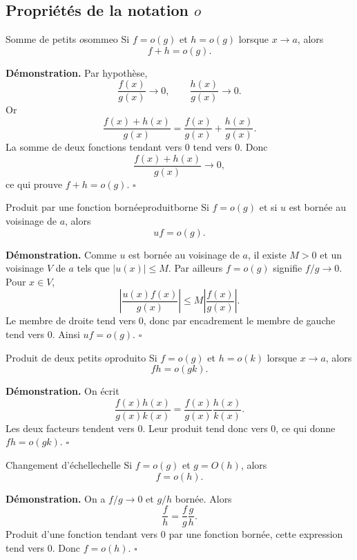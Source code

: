 \documentclass[11pt,a4paper]{article}
\begin{document}
\subsection{Propriétés de la notation $o$}

\begin{propositionbox}{Somme de petits $o$}{sommeo}
Si $f=o(g)$ et $h=o(g)$ lorsque $x\to a$, alors
\[
  f+h=o(g).
\]
\end{propositionbox}

\textbf{Démonstration.} Par hypothèse,
\[
  \frac{f(x)}{g(x)}\to0,\qquad \frac{h(x)}{g(x)}\to0.
\]
Or
\[
  \frac{f(x)+h(x)}{g(x)}=\frac{f(x)}{g(x)}+\frac{h(x)}{g(x)}.
\]
La somme de deux fonctions tendant vers $0$ tend vers $0$. Donc
\[
  \frac{f(x)+h(x)}{g(x)}\to0,
\]
ce qui prouve $f+h=o(g)$.
\hfill $\square$

\begin{propositionbox}{Produit par une fonction bornée}{produitborne}
Si $f=o(g)$ et si $u$ est bornée au voisinage de $a$, alors
\[
  uf=o(g).
\]
\end{propositionbox}

\textbf{Démonstration.} Comme $u$ est bornée au voisinage de $a$, il existe $M>0$ et un voisinage $V$ de $a$ tels que $|u(x)|\le M$. Par ailleurs $f=o(g)$ signifie $f/g\to0$. Pour $x\in V$,
\[
  \left|\frac{u(x)f(x)}{g(x)}\right|\le M\left|\frac{f(x)}{g(x)}\right|.
\]
Le membre de droite tend vers $0$, donc par encadrement le membre de gauche tend vers $0$. Ainsi $uf=o(g)$.
\hfill $\square$

\begin{propositionbox}{Produit de deux petits $o$}{produito}
Si $f=o(g)$ et $h=o(k)$ lorsque $x\to a$, alors
\[
  fh=o(gk).
\]
\end{propositionbox}

\textbf{Démonstration.} On écrit
\[
  \frac{f(x)h(x)}{g(x)k(x)}=\frac{f(x)}{g(x)}\frac{h(x)}{k(x)}.
\]
Les deux facteurs tendent vers $0$. Leur produit tend donc vers $0$, ce qui donne $fh=o(gk)$.
\hfill $\square$

\begin{propositionbox}{Changement d'échelle}{chelle}
Si $f=o(g)$ et $g=O(h)$, alors
\[
  f=o(h).
\]
\end{propositionbox}

\textbf{Démonstration.} On a $f/g\to0$ et $g/h$ bornée. Alors
\[
  \frac{f}{h}=\frac{f}{g}\frac{g}{h}.
\]
Produit d'une fonction tendant vers $0$ par une fonction bornée, cette expression tend vers $0$. Donc $f=o(h)$.
\hfill $\square$
\end{document}
